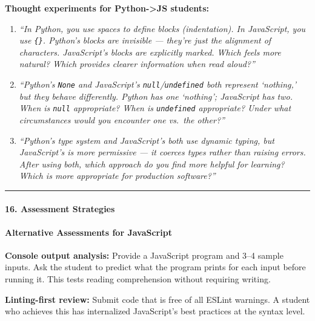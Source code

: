 \documentclass[
  justified,
  openright,
]{tufte-book}
\let\subsection\paragraph
\let\paragraph\paragraph
\let\subsection\paragraph
\let\paragraph\paragraph
\begin{document}
\textbf{Thought experiments for Python-\textgreater JS students:}

\begin{enumerate}
\def\labelenumi{\arabic{enumi}.}
\item
  \emph{``In Python, you use spaces to define blocks (indentation). In
  JavaScript, you use \texttt{\{\}}. Python's blocks are invisible ---
  they're just the alignment of characters. JavaScript's blocks are
  explicitly marked. Which feels more natural? Which provides clearer
  information when read aloud?''}
\item
  \emph{``Python's \texttt{None} and JavaScript's
  \texttt{null}/\texttt{undefined} both represent `nothing,' but they
  behave differently. Python has one `nothing'; JavaScript has two. When
  is \texttt{null} appropriate? When is \texttt{undefined} appropriate?
  Under what circumstances would you encounter one vs.~the other?''}
\item
  \emph{``Python's type system and JavaScript's both use dynamic typing,
  but JavaScript's is more permissive --- it coerces types rather than
  raising errors. After using both, which approach do you find more
  helpful for learning? Which is more appropriate for production
  software?''}
\end{enumerate}

\begin{center}\rule{0.5\linewidth}{0.5pt}\end{center}

\subsection{16. Assessment Strategies}\label{assessment-strategies-1}

\subsection{Alternative Assessments for
JavaScript}\label{alternative-assessments-for-javascript}

\textbf{Console output analysis:} Provide a JavaScript program and 3--4
sample inputs. Ask the student to predict what the program prints for
each input before running it. This tests reading comprehension without
requiring writing.

\textbf{Linting-first review:} Submit code that is free of all ESLint
warnings. A student who achieves this has internalized JavaScript's best
practices at the syntax level.
\end{document}
